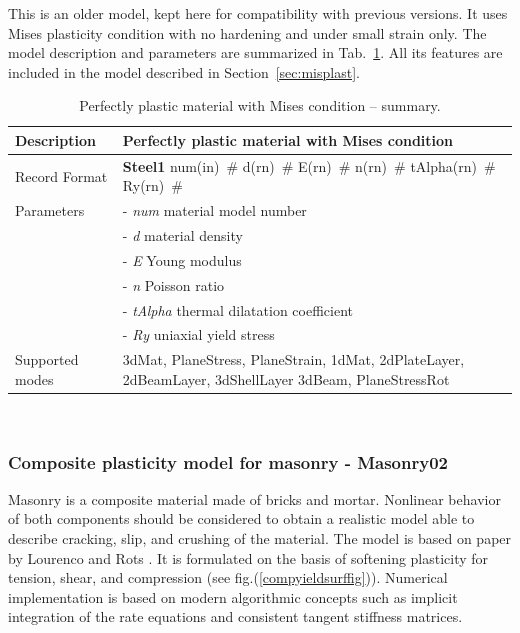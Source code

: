 \documentclass[a4paper]{article}
\newcommand{\descitem}[1]{{\noindent \bf #1}}
\newcommand{\elemparam}[2]{{{#1\tiny (#2)}~\#}}
\newcommand{\param}[1]{{\it #1}}
\newenvironment{mmt}{\begin{tabular}{|l|p{9cm}|}}{\end{tabular}\\}
\newenvironment{mmt}{\begin{tabular}{|l|l|}}{\end{tabular}\\}
\begin{document}
This is an older model, kept here for compatibility with previous versions.
It uses Mises plasticity condition with no hardening and under small strain only.
The model description and parameters are summarized
in Tab.~\ref{Steel1_table}. All its features are included in the model
described in Section~\ref{sec:misplast}. 

\begin{table}[!htb]
\begin{mmt}
\hline
Description & Perfectly plastic material with Mises condition\\
\hline
Record Format & \descitem{Steel1} \elemparam{num}{in}
\elemparam{d}{rn} \elemparam{E}{rn} \elemparam{n}{rn}
\elemparam{tAlpha}{rn} \elemparam{Ry}{rn}\\
Parameters &- \param{num} material model number\\
&- \param{d} material density\\
&- \param{E} Young modulus\\
&- \param{n} Poisson ratio\\
&- \param{tAlpha} thermal dilatation coefficient\\
&- \param{Ry} uniaxial yield stress\\
Supported modes& 3dMat, PlaneStress, PlaneStrain, 1dMat,
2dPlateLayer, 2dBeamLayer, 3dShellLayer
3dBeam, PlaneStressRot\\
\hline
\end{mmt}
\caption{Perfectly plastic material  with Mises condition -- summary.}
\label{Steel1_table}
\end{table}


\subsubsection{Composite plasticity model for masonry - Masonry02}
Masonry is a composite material made of bricks and mortar. Nonlinear behavior of both components should be considered to obtain a realistic model able to describe cracking, slip, and crushing of the material. The model is based on paper by Lourenco and Rots \cite{Rots}. It is formulated on the basis of softening plasticity for tension, shear, and compression (see fig.(\ref{compyieldsurffig})). Numerical implementation is based on modern algorithmic concepts such as implicit integration of the rate equations and consistent tangent stiffness matrices.
\end{document}
